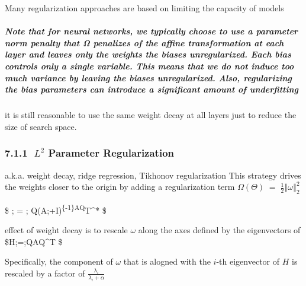\documentclass[11pt]{article}
\begin{document}
    Many regularization approaches are based on limiting the capacity of
models

    \hypertarget{note-that-for-neural-networks-we-typically-choose-to-use-a-parameter-norm-penalty-that-ux3c9-penalizes-of-the-affine-transformation-at-each-layer-and-leaves-only-the-weights-the-biases-unregularized.-each-bias-controls-only-a-single-variable.-this-means-that-we-do-not-induce-too-much-variance-by-leaving-the-biases-unregularized.-also-regularizing-the-bias-parameters-can-introduce-a-significant-amount-of-underfitting}{%
\subparagraph{Note that for neural networks, we typically choose to use
a parameter norm penalty that Ω penalizes of the affine transformation
at each layer and leaves only the weights the biases unregularized. Each
bias controls only a single variable. This means that we do not induce
too much variance by leaving the biases unregularized. Also,
regularizing the bias parameters can introduce a significant amount of
underfitting}\label{note-that-for-neural-networks-we-typically-choose-to-use-a-parameter-norm-penalty-that-ux3c9-penalizes-of-the-affine-transformation-at-each-layer-and-leaves-only-the-weights-the-biases-unregularized.-each-bias-controls-only-a-single-variable.-this-means-that-we-do-not-induce-too-much-variance-by-leaving-the-biases-unregularized.-also-regularizing-the-bias-parameters-can-introduce-a-significant-amount-of-underfitting}}

    it is still reasonable to use the same weight decay at all layers just
to reduce the size of search space.

    \hypertarget{l2-parameter-regularization}{%
\subsubsection{\texorpdfstring{7.1.1 \(\;L^2\) Parameter
Regularization}{7.1.1 \textbackslash{};L\^{}2 Parameter Regularization}}\label{l2-parameter-regularization}}

    a.k.a. weight decay, ridge regression, Tikhonov regularization This
strategy drives the weights closer to the origin by adding a
regularization term
\({\Omega}({\Theta})\; = \; \frac{1}{2}\left\Vert{\omega}\right\Vert^2_2\)

    \$ \omega ; = ; Q(A;+\alpha I)\textsuperscript{\{-1\}AQ}T\omega\^{}* \$

    effect of weight decay is to rescale \(\omega\) along the axes defined
by the eigenvectors of \$H;=;QAQ\^{}T \$

    Specifically, the component of \(\omega\) that is alogned with the
\(i\)-th eigenvector of \(H\) is rescaled by a factor of
\(\frac{\lambda_i}{\lambda_i + \alpha}\)
\end{document}
